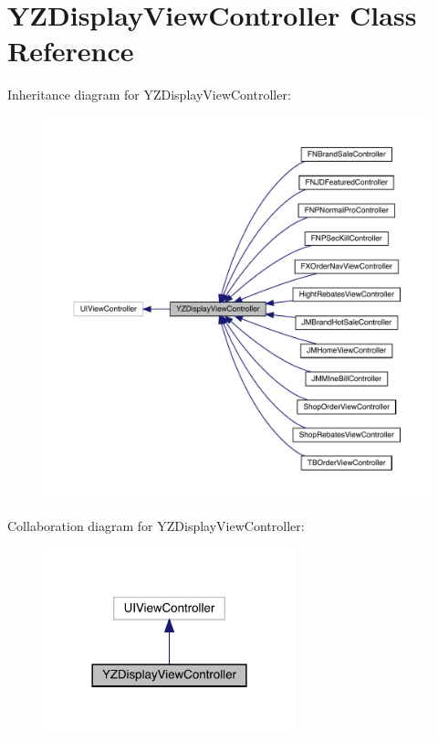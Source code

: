 \hypertarget{interface_y_z_display_view_controller}{}\section{Y\+Z\+Display\+View\+Controller Class Reference}
\label{interface_y_z_display_view_controller}


Inheritance diagram for Y\+Z\+Display\+View\+Controller\+:\nopagebreak
\begin{figure}[H]
\begin{center}
\leavevmode
\includegraphics[width=350pt]{interface_y_z_display_view_controller__inherit__graph}
\end{center}
\end{figure}


Collaboration diagram for Y\+Z\+Display\+View\+Controller\+:\nopagebreak
\begin{figure}[H]
\begin{center}
\leavevmode
\includegraphics[width=206pt]{interface_y_z_display_view_controller__coll__graph}
\end{center}
\end{figure}
